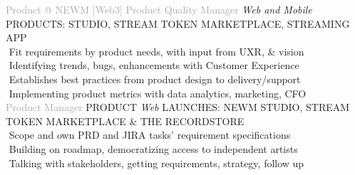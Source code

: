     
\begin{cvtable}
    {\textcolor{darkgray} {Product \newline @ NEWM [Web3] } }
    { }{{ {    } }}
%
    {\textcolor{darkgray}
    {
    Product Quality Manager %
    }
    }
    { }%
    {
    {
    {\scriptsize
    \textit{Web and Mobile}
    PRODUCTS: STUDIO, STREAM TOKEN MARKETPLACE, STREAMING APP
    } \\
     \textperiodcentered $ $ Fit requirements by product needs, with input from UXR, \& vision \\
     \textperiodcentered $ $ Identifying trends, bugs, enhancements %
     with Customer Experience \\
     \textperiodcentered $ $ Establishes best practices from product design to delivery/support \\
     \textperiodcentered $ $ Implementing product metrics with data analytics, marketing, CFO \\
    }}
%
%
    {\textcolor{darkgray}{
    Product 
    Manager
    }}%
    {
    }%
    {%
    {\scriptsize
    PRODUCT
    \textit{Web} LAUNCHES: NEWM STUDIO, STREAM TOKEN MARKETPLACE \& THE RECORDSTORE} \\
     \textperiodcentered $ $ Scope and own PRD and JIRA tasks' requirement specifications \\
     \textperiodcentered $ $ Building on roadmap, democratizing access to independent artists \\
     \textperiodcentered $ $ Talking with stakeholders, getting requirements, strategy, follow up \\  %
}


\end{cvtable}
